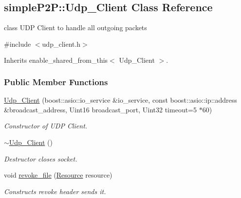 \hypertarget{classsimpleP2P_1_1Udp__Client}{}\subsection{simple\+P2P\+:\+:Udp\+\_\+\+Client Class Reference}
\label{classsimpleP2P_1_1Udp__Client}


class U\+DP Client to handle all outgoing packets  




{\ttfamily \#include $<$udp\+\_\+client.\+h$>$}



Inherits enable\+\_\+shared\+\_\+from\+\_\+this$<$ Udp\+\_\+\+Client $>$.

\subsubsection*{Public Member Functions}
\begin{DoxyCompactItemize}
\item 
\hyperlink{classsimpleP2P_1_1Udp__Client_acb5ed96ec556665f56510c27f234bb5a}{Udp\+\_\+\+Client} (boost\+::asio\+::io\+\_\+service \&io\+\_\+service, const boost\+::asio\+::ip\+::address \&broadcast\+\_\+address, Uint16 broadcast\+\_\+port, Uint32 timeout=5 $\ast$60)
\begin{DoxyCompactList}\small\item\em Constructor of U\+DP Client. \end{DoxyCompactList}\item 
\mbox{\label{classsimpleP2P_1_1Udp__Client_a710c95899ddcfba71004d780ab4c1e4d}} 
\hyperlink{classsimpleP2P_1_1Udp__Client_a710c95899ddcfba71004d780ab4c1e4d}{$\sim$\+Udp\+\_\+\+Client} ()
\begin{DoxyCompactList}\small\item\em Destructor closes socket. \end{DoxyCompactList}\item 
void \hyperlink{classsimpleP2P_1_1Udp__Client_a459f622d0f3671d48d33bce035f5de90}{revoke\+\_\+file} (\hyperlink{classsimpleP2P_1_1Resource}{Resource} resource)
\begin{DoxyCompactList}\small\item\em Constructs revoke header sends it. \end{DoxyCompactList}\end{DoxyCompactItemize}


